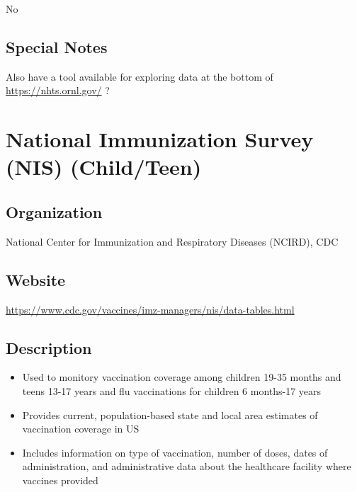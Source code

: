 \documentclass[
]{book}
\providecommand{\tightlist}{%
  \setlength{\itemsep}{0pt}\setlength{\parskip}{0pt}}
\begin{document}
No

\hypertarget{special-notes-53}{%
\section{Special Notes}\label{special-notes-53}}

Also have a tool available for exploring data at the bottom of \url{https://nhts.ornl.gov/} ?

\mainmatter

\hypertarget{national-immunization-survey-nis-childteen}{%
\chapter{National Immunization Survey (NIS) (Child/Teen)}\label{national-immunization-survey-nis-childteen}}

\hypertarget{organization-54}{%
\section{Organization}\label{organization-54}}

National Center for Immunization and Respiratory Diseases (NCIRD), CDC

\hypertarget{website-54}{%
\section{Website}\label{website-54}}

\url{https://www.cdc.gov/vaccines/imz-managers/nis/data-tables.html}

\hypertarget{description-54}{%
\section{Description}\label{description-54}}

\begin{itemize}
\tightlist
\item
  Used to monitory vaccination coverage among children 19-35 months and teens 13-17 years and flu vaccinations for children 6 months-17 years
\item
  Provides current, population-based state and local area estimates of vaccination coverage in US
\item
  Includes information on type of vaccination, number of doses, dates of administration, and administrative data about the healthcare facility where vaccines provided
\end{itemize}
\end{document}
